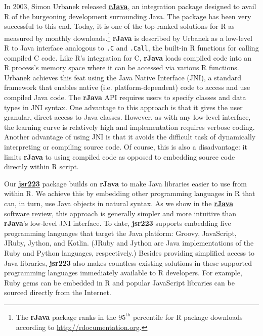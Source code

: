 \documentclass[
article,
11pt, %
a4paper, %
oneside, %
headinclude,footinclude, %
]{scrartcl}
\theoremstyle{definition} %
\theoremstyle{plain} %
\theoremstyle{remark} %
\newcommand{\pkg}[1]{\textbf{#1}}
\newcommand{\CRANpkg}[1]{\href{https://CRAN.R-project.org/package=#1}{\pkg{#1}}}
\newcommand{\code}[1]{\texttt{#1}}
\begin{document}
In 2003, Simon Urbanek released \CRANpkg{rJava}, an integration package designed to avail R of the burgeoning development surrounding Java. The package has been very successful to this end. Today, it is one of the top-ranked solutions for R as measured by monthly downloads.\footnote{The \pkg{rJava} package ranks in the $95^{\text{th}}$ percentile for R package downloads according to \href{http://rdocumentation.org}{http://rdocumentation.org}.} \pkg{rJava} is described by Urbanek as a low-level R to Java interface analogous to \code{.C} and \code{.Call}, the built-in R functions for calling compiled C code. Like R's integration for C, \pkg{rJava} loads compiled code into an R process's memory space where it can be accessed via various R functions. Urbanek achieves this feat using the Java Native Interface (JNI), a standard framework that enables native (i.e. platform-dependent) code to access and use compiled Java code. The \pkg{rJava} API requires users to specify classes and data types in JNI syntax. One advantage to this approach is that it gives the user granular, direct access to Java classes. However, as with any low-level interface, the learning curve is relatively high and implementation requires verbose coding. Another advantage of using JNI is that it avoids the difficult task of dynamically interpreting or compiling source code. Of course, this is also a disadvantage: it limits \pkg{rJava} to using compiled code as opposed to embedding source code directly within R script.

Our \CRANpkg{jsr223} package builds on \pkg{rJava} to make Java libraries easier to use from within R. We achieve this by embedding other programming languages in R that can, in turn, use Java objects in natural syntax. As we show in the \hyperlink{rjava-software-review}{\pkg{rJava} software review}, this approach is generally simpler and more intuitive than \pkg{rJava}'s low-level JNI interface. To date, \pkg{jsr223} supports embedding five programming languages that target the Java platform: Groovy, JavaScript, JRuby, Jython, and Kotlin. (JRuby and Jython are Java implementations of the Ruby and Python languages, respectively.) Besides providing simplified access to Java libraries, \pkg{jsr223} also makes countless existing solutions in these supported programming languages immediately available to R developers. For example, Ruby gems can be embedded in R and popular JavaScript libraries can be sourced directly from the Internet.
\end{document}
